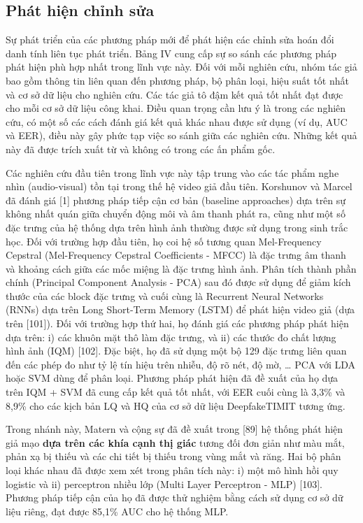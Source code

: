 \documentclass{article}
\begin{document}
\subsection{Phát hiện chỉnh sửa}

Sự phát triển của các phương pháp mới để phát hiện các chỉnh sửa hoán đổi danh tính liên tục phát triển. Bảng IV cung cấp sự so sánh các phương pháp phát hiện phù hợp nhất trong lĩnh vực này. Đối với mỗi nghiên cứu, nhóm tác giả bao gồm thông tin liên quan đến phương pháp, bộ phân loại, hiệu suất tốt nhất và cơ sở dữ liệu cho nghiên cứu. Các tác giả tô đậm kết quả tốt nhất đạt được cho mỗi cơ sở dữ liệu công khai. Điều quan trọng cần lưu ý là trong các nghiên cứu, có một số các cách đánh giá kết quả khác nhau được sử dụng (ví dụ, AUC và EER), điều này gây phức tạp việc so sánh giữa các nghiên cứu. Những kết quả này đã được trích xuất từ  và không có trong các ấn phẩm gốc.


Các nghiên cứu đầu tiên trong lĩnh vực này tập trung vào các tác phẩm nghe nhìn (audio-visual) tồn tại trong thế hệ video giả đầu tiên. Korshunov và Marcel đã đánh giá [1] phương pháp tiếp cận cơ bản (baseline approaches) dựa trên sự không nhất quán giữa chuyển động môi và âm thanh phát ra, cũng như một số đặc trưng của hệ thống dựa trên hình ảnh thường được sử dụng trong sinh trắc học. Đối với trường hợp đầu tiên, họ coi hệ số tương quan Mel-Frequency Cepstral (Mel-Frequency Cepstral Coefficients - MFCC) là đặc trưng âm thanh và khoảng cách giữa các mốc miệng là đặc trưng hình ảnh. Phân tích thành phần chính (Principal Component Analysis - PCA) sau đó được sử dụng để giảm kích thước của các block đặc trưng và cuối cùng là Recurrent Neural Networks (RNNs) dựa trên Long Short-Term Memory (LSTM) để phát hiện video giả (dựa trên [101]). Đối với trường hợp thứ hai, họ đánh giá các phương pháp phát hiện dựa trên: i) các khuôn mặt thô làm đặc trưng, và ii) các thước đo chất lượng hình ảnh (IQM) [102]. Đặc biệt, họ đã sử dụng một bộ 129 đặc trưng liên quan đến các phép đo như tỷ lệ tín hiệu trên nhiễu, độ rõ nét, độ mờ, … PCA với LDA hoặc SVM dùng để phân loại. Phương pháp phát hiện đã đề xuất của họ dựa trên IQM + SVM đã cung cấp kết quả tốt nhất, với EER cuối cùng là 3,3\% và 8,9\% cho các kịch bản LQ và HQ của cơ sở dữ liệu DeepfakeTIMIT tương ứng.

Trong nhánh này, Matern và cộng sự đã đề xuất trong [89] hệ thống phát hiện giả mạo \textbf{dựa trên các khía cạnh thị giác} tương đối đơn giản như màu mắt, phản xạ bị thiếu và các chi tiết bị thiếu trong vùng mắt và răng. Hai bộ phân loại khác nhau đã được xem xét trong phân tích này: i) một mô hình hồi quy logistic và ii) perceptron nhiều lớp (Multi Layer Perceptron - MLP) [103]. Phương pháp tiếp cận của họ đã được thử nghiệm bằng cách sử dụng cơ sở dữ liệu riêng, đạt được 85,1\% AUC cho hệ thống MLP.
\end{document}
